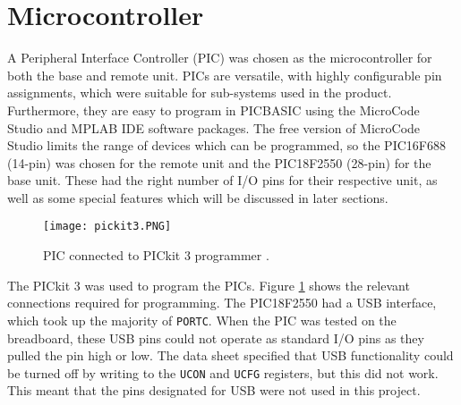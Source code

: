 \section{Microcontroller}
A Peripheral Interface Controller (PIC) was chosen as the microcontroller for both the base and remote unit. PICs are versatile, with highly configurable pin assignments, which were suitable for sub-systems used in the product. Furthermore, they are easy to program in PICBASIC using the MicroCode Studio \cite{microcode_studio} and MPLAB IDE software packages. The free version of MicroCode Studio limits the range of devices which can be programmed, so the PIC16F688 (14-pin) \cite{pic16f688} was chosen for the remote unit and the PIC18F2550 (28-pin) \cite{pic18f2550} for the base unit. These had the right number of I/O pins for their respective unit, as well as some special features which will be discussed in later sections.\\

\begin{figure}[htb]
	\centering
	\texttt{[image: pickit3.PNG]}
	\caption{PIC connected to PICkit 3 programmer \cite{pickit3}.}
	\label{fig: pickit3}
\end{figure}

The PICkit 3 \cite{pickit3} was used to program the PICs. Figure \ref{fig: pickit3} shows the relevant connections required for programming. The PIC18F2550 had a USB interface, which took up the majority of \verb|PORTC|. When the PIC was tested on the breadboard, these USB pins could not operate as standard I/O pins as they pulled the pin high or low. The data sheet specified that USB functionality could be turned off by writing to the \verb|UCON| and \verb|UCFG| registers, but this did not work. This meant that the pins designated for USB were not used in this project.\\
